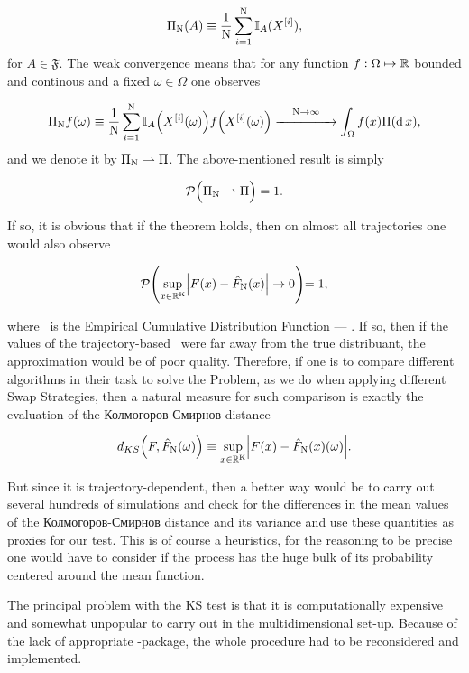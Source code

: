 \documentclass{book}
\begin{document}
$$ \Pi_{\mathrm{N}}(A) \equiv \frac{1}{\mathrm{N}}\sum_{i = 1}^{\mathrm{N}} \mathbb{I}_A (X^{[i]}),$$ 
for $A \in \mathfrak{F}$. The weak convergence means that for any function $f: \Omega \mapsto \mathbb{R}$ bounded and continous and a fixed $\omega \in \Omega$ one observes 

$$ \Pi_{\mathrm{N}} f (\omega)\equiv \frac{1}{\mathrm{N}}\sum_{i = 1}^{\mathrm{N}} \mathbb{I}_A \Big(X^{[i]}(\omega)\Big) f\Big(X^{[i]}(\omega)\Big) \overset{\mathrm{N}\rightarrow \infty}{\xrightarrow{\hspace*{1.5cm}}} \int_\Omega f(x) \Pi( \mathrm{d}\,x ),$$
and we denote it by $\Pi_{\mathrm{N}} \rightharpoonup \Pi$. The above-mentioned result is simply

$$ \mathcal{P} \Big( \Pi_{\mathrm{N}} \rightharpoonup \Pi \Big) = 1.$$

If so, it is obvious that if the theorem holds, then on almost all trajectories one would also observe 

\begin{equation*}\label{KS definition}
	\mathcal{P}\Biggl(\underset{x \in \mathbb{R}^{\mathrm{K}}}{\sup}\Big| F(x) - \hat{F}_{\mathrm{N}} (x)\Big| \rightarrow 0\Biggl) = 1,
\end{equation*}

where \Fecdf\, is the Empirical Cumulative Distribution Function --- \ecdf. If so, then if the values of the trajectory-based \ecdf\, were far away from the true distribuant, the approximation would be of poor quality. Therefore, if one is to compare different algorithms in their task to solve the Problem, as we do when applying different Swap Strategies, then a natural measure for such comparison is exactly the evaluation of the Колмогоров-Смирнов distance

$$ d_{KS}\Big( F, \hat{F}_{\mathrm{N}} (\omega) \Big) \equiv \underset{x \in \mathbb{R}^{\mathrm{K}}}{\sup}\Big| F(x) - \hat{F}_{\mathrm{N}} (x)(\omega)\Big|.$$

But since it is trajectory-dependent, then a better way would be to carry out several hundreds of simulations and check for the differences in the mean values of the Колмогоров-Смирнов distance and its variance and use these quantities as proxies for our test. This is of course a heuristics, for the reasoning to be precise one would have to consider if the process has the huge bulk of its probability centered around the mean function.  


The principal problem with the KS test is that it is computationally expensive and somewhat unpopular to carry out in the multidimensional set-up. Because of the lack of appropriate \RR-package, the whole procedure had to be reconsidered and implemented. 
\end{document}
